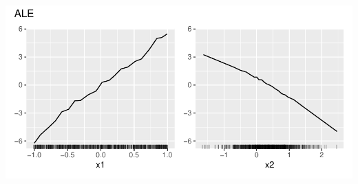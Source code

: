 {\begin{enumerate}[a)]
\begin{enumerate}
\begin{center}
\includegraphics[width=\maxwidth]{figure/ALE_Plot.pdf}
\end{center}



\end{enumerate}
\end{enumerate}
}
